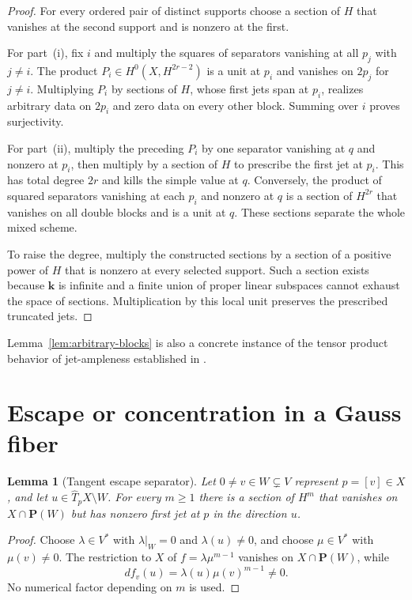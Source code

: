 \documentclass[11pt]{article}
\newtheorem{lemma}[theorem]{Lemma}
\newcommand{\PP}{\mathbf P}
\newcommand{\kk}{\mathbf k}
\begin{document}
\begin{proof}
For every ordered pair of distinct supports choose a section of $H$ that
vanishes at the second support and is nonzero at the first.

For part~(i), fix $i$ and multiply the squares of separators vanishing at all
$p_j$ with $j\neq i$.  The product $P_i\in H^0(X,H^{2r-2})$ is a unit at
$p_i$ and vanishes on $2p_j$ for $j\neq i$.  Multiplying $P_i$ by sections of
$H$, whose first jets span at $p_i$, realizes arbitrary data on $2p_i$ and
zero data on every other block.  Summing over $i$ proves surjectivity.

For part~(ii), multiply the preceding $P_i$ by one separator vanishing at
$q$ and nonzero at $p_i$, then multiply by a section of $H$ to prescribe the
first jet at $p_i$.  This has total degree $2r$ and kills the simple value at
$q$.  Conversely, the product of squared separators vanishing at each
$p_i$ and nonzero at $q$ is a section of $H^{2r}$ that vanishes on all double
blocks and is a unit at $q$.  These sections separate the whole mixed scheme.

To raise the degree, multiply the constructed sections by a section of a
positive power of $H$ that is nonzero at every selected support.  Such a
section exists because $\kk$ is infinite and a finite union of proper linear
subspaces cannot exhaust the space of sections.  Multiplication by this local
unit preserves the prescribed truncated jets.
\end{proof}

Lemma~\ref{lem:arbitrary-blocks} is also a concrete instance of the tensor
product behavior of jet-ampleness established in
\cite[Proposition~2.3]{BeltramettiDiRoccoSommese1999}.

\section{Escape or concentration in a Gauss fiber}

\begin{lemma}[Tangent escape separator]\label{lem:separator}
Let $0\neq v\in W\subsetneq V$ represent $p=[v]\in X$, and let
$u\in\widehat T_pX\setminus W$.  For every $m\geq1$ there is a section of
$H^m$ that vanishes on $X\cap\PP(W)$ but has nonzero first jet at $p$ in the
direction $u$.
\end{lemma}

\begin{proof}
Choose $\lambda\in V^*$ with $\lambda|_W=0$ and $\lambda(u)\neq0$, and choose
$\mu\in V^*$ with $\mu(v)\neq0$.  The restriction to $X$ of
$f=\lambda\mu^{m-1}$ vanishes on $X\cap\PP(W)$, while
\[
 df_v(u)=\lambda(u)\mu(v)^{m-1}\neq0.
\]
No numerical factor depending on $m$ is used.
\end{proof}
\end{document}
